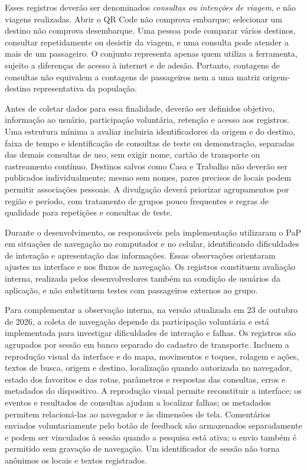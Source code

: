 \documentclass[12pt,oneside,a4paper,brazil,chapter=TITLE]{abntex2}
\begin{document}
Esses registros deverão ser denominados \textit{consultas ou intenções de viagem}, e não viagens realizadas. Abrir o QR Code não comprova embarque; selecionar um destino não comprova desembarque. Uma pessoa pode comparar vários destinos, consultar repetidamente ou desistir da viagem, e uma consulta pode atender a mais de um passageiro. O conjunto representa apenas quem utiliza a ferramenta, sujeito a diferenças de acesso à internet e de adesão. Portanto, contagens de consultas não equivalem a contagens de passageiros nem a uma matriz origem-destino representativa da população.

Antes de coletar dados para essa finalidade, deverão ser definidos objetivo, informação ao usuário, participação voluntária, retenção e acesso aos registros. Uma estrutura mínima a avaliar incluiria identificadores da origem e do destino, faixa de tempo e identificação de consultas de teste ou demonstração, separadas das demais consultas de uso, sem exigir nome, cartão de transporte ou rastreamento contínuo. Destinos salvos como Casa e Trabalho não deverão ser publicados individualmente; mesmo sem nomes, pares precisos de locais podem permitir associações pessoais. A divulgação deverá priorizar agrupamentos por região e período, com tratamento de grupos pouco frequentes e regras de qualidade para repetições e consultas de teste.

Durante o desenvolvimento, os responsáveis pela implementação utilizaram o PaP em situações de navegação no computador e no celular, identificando dificuldades de interação e apresentação das informações. Essas observações orientaram ajustes na interface e nos fluxos de navegação. Os registros constituem avaliação interna, realizada pelos desenvolvedores também na condição de usuários da aplicação, e não substituem testes com passageiros externos ao grupo.



Para complementar a observação interna, na versão atualizada em 23 de outubro de 2026, a coleta de navegação depende da participação voluntária e está implementada para investigar dificuldades de interação e falhas. Os registros são agrupados por sessão em banco separado do cadastro de transporte. Incluem a reprodução visual da interface e do mapa, movimentos e toques, rolagem e ações, textos de busca, origem e destino, localização quando autorizada no navegador, estado dos favoritos e das rotas, parâmetros e respostas das consultas, erros e metadados do dispositivo. A reprodução visual permite reconstituir a interface; os eventos e resultados de consultas ajudam a localizar falhas; os metadados permitem relacioná-las ao navegador e às dimensões de tela. Comentários enviados voluntariamente pelo botão de feedback são armazenados separadamente e podem ser vinculados à sessão quando a pesquisa está ativa; o envio também é permitido sem gravação de navegação. Um identificador de sessão não torna anônimos os locais e textos registrados.
\end{document}
